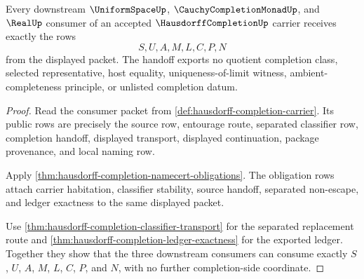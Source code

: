 \begin{theorem}
\label{thm:hausdorff-completion-consumer-handoff-exhaustion}
Every downstream $\UniformSpaceUp$, $\CauchyCompletionMonadUp$, and $\RealUp$ consumer of an accepted $\HausdorffCompletionUp$ carrier receives exactly the rows
$$
S,U,A,M,L,C,P,N
$$
from the displayed packet. The handoff exports no quotient completion class, selected representative, host equality, uniqueness-of-limit witness, ambient-completeness principle, or unlisted completion datum.
\end{theorem}
\begin{proof}
Read the consumer packet from \autoref{def:hausdorff-completion-carrier}. Its public rows are precisely the source row, entourage route, separated classifier row, completion handoff, displayed transport, displayed continuation, package provenance, and local naming row.

Apply \autoref{thm:hausdorff-completion-namecert-obligations}. The obligation rows attach carrier habitation, classifier stability, source handoff, separated non-escape, and ledger exactness to the same displayed packet.

Use \autoref{thm:hausdorff-completion-classifier-transport} for the separated replacement route and \autoref{thm:hausdorff-completion-ledger-exactness} for the exported ledger. Together they show that the three downstream consumers can consume exactly $S$, $U$, $A$, $M$, $L$, $C$, $P$, and $N$, with no further completion-side coordinate.
\end{proof}

